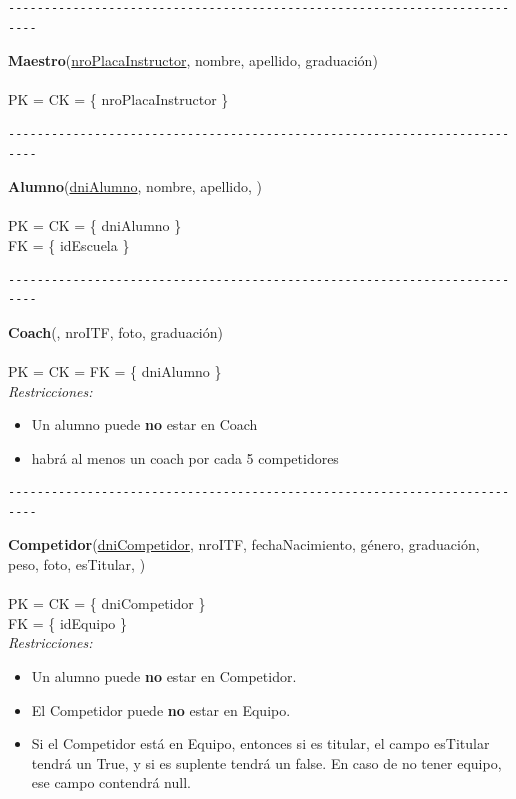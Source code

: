 \begin{verbatim}
--------------------------------------------------------------------------
\end{verbatim}

\noindent\textbf{Maestro}(\uline{nroPlacaInstructor}, nombre, apellido, graduación)
\\
\\
PK = CK = \{ nroPlacaInstructor \} \\


\begin{verbatim}
--------------------------------------------------------------------------
\end{verbatim}

\noindent\textbf{Alumno}(\uline{dniAlumno}, nombre, apellido, )
\\
\\
PK = CK = \{ dniAlumno \} \\
FK = \{ idEscuela \} \\


\begin{verbatim}
--------------------------------------------------------------------------
\end{verbatim}

\noindent\textbf{Coach}(, nroITF, foto, graduación)
\\
\\
PK = CK = FK = \{ dniAlumno \} \\

\textit{Restricciones:}
\begin{itemize}
	\item Un alumno puede \textbf{no} estar en Coach
	\item habrá al menos un coach por cada 5 competidores
\end{itemize}


\begin{verbatim}
--------------------------------------------------------------------------
\end{verbatim}

\noindent\textbf{Competidor}(\uline{dniCompetidor}, nroITF, fechaNacimiento, género, graduación, peso, foto, esTitular, )
\\
\\
PK = CK = \{ dniCompetidor \} \\
FK = \{ idEquipo \} \\


\textit{Restricciones:}
\begin{itemize}
	\item Un alumno puede \textbf{no} estar en Competidor.
	\item El Competidor puede \textbf{no} estar en Equipo.
	\item Si el Competidor está en Equipo, entonces si es titular, el campo esTitular tendrá un True, y si es suplente tendrá un false. En caso de no tener equipo, ese campo contendrá null.
\end{itemize}


